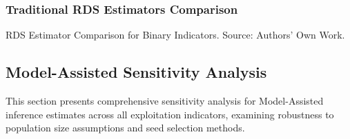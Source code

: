 \documentclass[
  12pt,
  letterpaper,
  DIV=11,
  numbers=noendperiod]{scrartcl}
\theoremstyle{plain}
\theoremstyle{definition}
\begin{document}
\begin{table}
{}

\end{table}%

\subsubsection{Traditional RDS Estimators
Comparison}\label{traditional-rds-estimators-comparison}

\begin{table}

\caption{\label{tbl-rds-comparison}RDS Estimator Comparison for Binary
Indicators. Source: Authors' Own Work.}


\end{table}%

\subsection{Model-Assisted Sensitivity
Analysis}\label{model-assisted-sensitivity-analysis}

This section presents comprehensive sensitivity analysis for
Model-Assisted inference estimates across all exploitation indicators,
examining robustness to population size assumptions and seed selection
methods.
\end{document}
